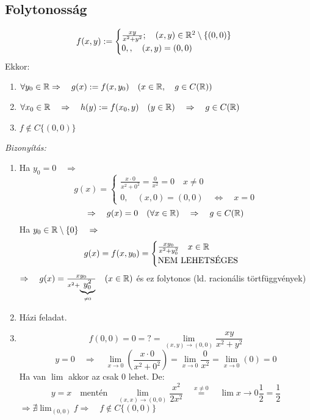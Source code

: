 \documentclass[a4paper,11.5pt]{article}
\begin{document}
	\subsection{Folytonosság}
	\begin{example}
		\[ f(x,y):=\begin{cases}
		\frac{xy}{x^2+y^2};\quad (x,y)\in\mathbb{R}^2\setminus\{ (0,0) \}\\
		0,,\quad (x,y)=(0,0)
		\end{cases} \]
		Ekkor:
		\begin{enumerate}
			\item $\forall y_0\in\mathbb{R}\Rightarrow\quad g(x):=f(x,y_0) \quad (x\in\mathbb{R},\quad g\in C(\mathbb{R}))$
			\item $\forall x_0\in\mathbb{R}\quad \Rightarrow\quad h(y):=f(x_0,y)\quad (y\in\mathbb{R})\quad \Rightarrow\quad g\in C(\mathbb{R})$
			\item $f\notin C\{(0,0)\}$
		\end{enumerate}
		\textit{Bizonyítás:}
		
		\begin{enumerate}
			\item Ha $y_0=0\quad \Rightarrow$
			\[ g(x)=\begin{cases}
			\frac{x\cdot0}{x^2+0^2}=\frac{0}{x^2}=0\quad x\not=0\\
			0,\quad (x,0)=(0,0)\quad \Leftrightarrow\quad x=0
			\end{cases} \]
			\[ \Rightarrow\quad g(x)=0\quad (\forall x\in\mathbb{R}) \quad \Rightarrow\quad g\in C(\mathbb{R}) \]
			Ha $y_0\in\mathbb{R}\setminus\{ 0 \}\quad \Rightarrow$
			\[ g(x)=f(x,y_0)=\begin{cases}
			\frac{xy_0}{ x^2+y_0^2 }\quad x\in\mathbb{R}\\
			\text{NEM LEHETSÉGES}
			\end{cases}\]
			$\Rightarrow\quad g(x)=\frac{xy_0}{x^2+\underbrace{y_0^2}_{\not=0}}\quad (x\in\mathbb{R})$ és ez folytonos (ld. racionális törtfüggvények)
			\item Házi feladat.
			\item \[ f(0,0)=0=?=\lim_{(x,y)\to(0,0)}\frac{xy}{x^2+y^2} \]
			\[ y=0\quad \Rightarrow\quad \lim_{x\to0}\left(\frac{x\cdot0}{x^2+0^2}\right)=\lim_{x\to0}\frac{0}{x^2}=\lim_{x\to0}(0)=0 \]
			Ha van $\lim$ akkor az csak 0 lehet. De:
			\[ y=x\quad \text{mentén}\quad \lim_{(x,x)\to(0,0)}\frac{x^2}{2x^2}\quad\overset{x\not=0}{=} \quad \lim{x\to0}\frac{1}{2}=\frac{1}{2} \]
			$\Rightarrow\nexists\lim_{(0,0)}f\Rightarrow\quad f\notin C\{ (0,0) \}$ 
		\end{enumerate}
	\end{example}
\end{document}
